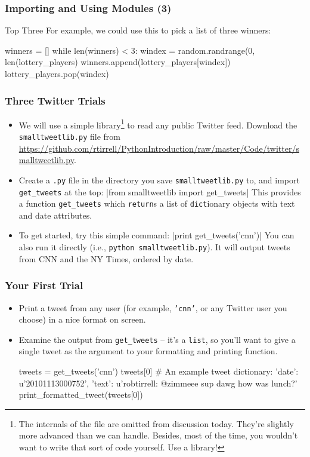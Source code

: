 \documentclass[10pt]{beamer}
\begin{document}
\begin{frame}[fragile]
  \frametitle{Importing and Using Modules (3)}
  \begin{block}{Top Three}
    For example, we could use this to pick a list of three winners:
    \begin{pythoncode}
  winners = []
  while len(winners) < 3:
    windex = random.randrange(0, len(lottery_players)
    winners.append(lottery_players[windex])
    lottery_players.pop(windex)
    \end{pythoncode}
  \end{block}
\end{frame}
    
\begin{frame}
  \frametitle{Three Twitter Trials}
  \begin{itemize}
    \item We will use a simple library\footnote{The internals of the file are omitted from discussion today. They're slightly more advanced than we can handle. Besides, most of the time, you wouldn't want to write that sort of code yourself. Use a library!} to read any public Twitter feed.
    Download the \texttt{smalltweetlib.py} file from 
      \footnotesize \href{https://github.com/rtirrell/PythonIntroduction/raw/master/Code/twitter/smalltweetlib.py}{https://github.com/rtirrell/PythonIntroduction/raw/master/Code/twitter/smalltweetlib.py}.
    \normalsize
    \item Create a \texttt{.py} file in the directory you save \texttt{smalltweetlib.py} to, and import \texttt{get\_tweets} at the top: 
      |from smalltweetlib import get_tweets|
      This provides a function \texttt{get\_tweets} which \texttt{return}s a list of \texttt{dict}ionary objects with text and date attributes.
    \item To get started, try this simple command: 
      |print get_tweets('cnn')|
      You can also run it directly (i.e., \texttt{python smalltweetlib.py}).
      It will output tweets from CNN and the NY Times, ordered by date.
  \end{itemize}
\end{frame}

\begin{frame}[fragile]
  \frametitle{Your First Trial}
  \begin{itemize}
    \item Print a tweet from any user (for example, \texttt{'cnn'}, or any Twitter user you choose) in a nice format on screen.
    \item Examine the output from \texttt{get\_tweets} -- it's a \texttt{list}, so you'll want to give a single tweet as the argument to your formatting and printing function. 
      \footnotesize
      \begin{pythoncode}
  tweets = get_tweets('cnn')
  tweets[0]
  # An example tweet dictionary:
  {
    'date': u'20101113000752', 
    'text': u'robtirrell: @zimmeee sup dawg how was lunch?'
  }
  print_formatted_tweet(tweets[0])
      \end{pythoncode}
        
  \end{itemize}
\end{frame}
\end{document}
